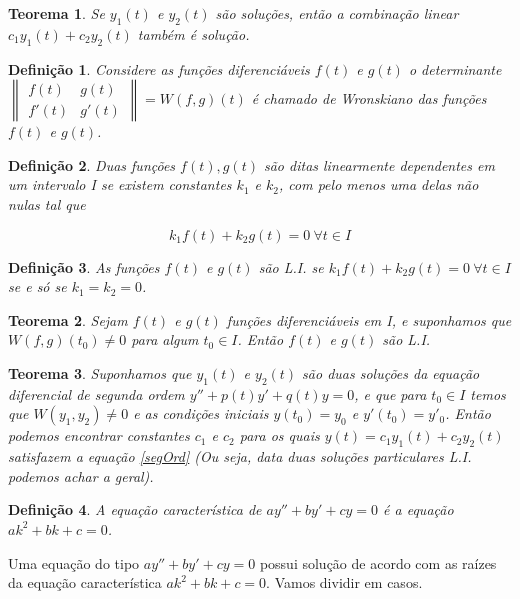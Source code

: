 \documentclass[12pt]{article}
\newtheorem{theorem}{Teorema}[section]
\newtheorem{definition}{Definição}
\begin{document}
\begin{theorem}
    Se $y_1(t)$ e $y_2(t)$ são soluções, então a combinação linear $c_1 y_1(t) + c_2 y_2(t)$ também é solução.
\end{theorem}

\begin{definition}
    Considere as funções diferenciáveis $f(t)$ e $g(t)$ o determinante $\left \| \begin{array}{cc}
    f(t) & g(t) \\
    f'(t) & g'(t)
    \end{array} \right \| = W(f, g)(t)$ é chamado de Wronskiano das funções $f(t)$ e $g(t)$.
\end{definition}

\begin{definition}
    Duas funções $f(t), g(t)$ são ditas linearmente dependentes em um intervalo I se existem constantes $k_1$ e $k_2$, com pelo menos uma delas não nulas tal que
    
    $$k_1 f(t) + k_2 g(t) = 0 \ \forall t \in I$$
\end{definition}

\begin{definition}
    As funções $f(t)$ e $g(t)$ são L.I. se $k_1 f(t) + k_2 g(t) = 0 \ \forall t \in I$ se e só se $k_1 = k_2 = 0$.
\end{definition}

\begin{theorem}
    Sejam $f(t)$ e $g(t)$ funções diferenciáveis em I, e suponhamos que $W(f, g)(t_0) \neq 0$ para algum $t_0 \in I$. Então $f(t)$ e $g(t)$ são L.I.
\end{theorem}

\begin{theorem}
    Suponhamos que $y_1(t)$ e $y_2(t)$ são duas soluções da equação diferencial de segunda ordem $y'' + p(t) y' + q(t) y = 0$, e que para $t_0 \in I$ temos que $W(y_1, y_2) \neq 0$ e as condições iniciais $y(t_0) = y_0$ e $y'(t_0) = y'_0$. Então podemos encontrar constantes $c_1$ e $c_2$ para os quais $y(t) = c_1 y_1(t) + c_2 y_2(t)$ satisfazem a equação \ref{segOrd} (Ou seja, data duas soluções particulares L.I. podemos achar a geral).
\end{theorem}

\begin{definition}
    A equação característica de $ay'' + by' + cy = 0$ é a equação $a k^2 + b k + c = 0$.
\end{definition}

Uma equação do tipo $ay'' + by' + cy = 0$ possui solução de acordo com as raízes da equação característica $a k^2 + b k + c = 0$. Vamos dividir em casos.
\end{document}
